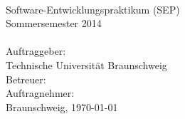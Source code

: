 \begin{titlepage}
\begin{center}
{}\\[5ex]

Software-Entwicklungspraktikum (SEP)\\
Sommersemester 2014\\[6ex]

{}\\[5ex]

Auftraggeber:\\
Technische Universität Braunschweig\\
\institut[2ex]
Betreuer: \betreuer\\[5ex]

Auftragnehmer:\\


\vfill
Braunschweig, \today

\end{center}
\end{titlepage}
